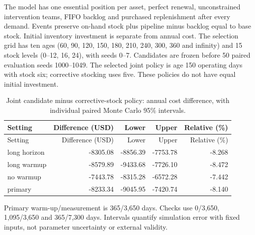 The model has one essential position per asset, perfect renewal, unconstrained intervention teams, FIFO backlog and purchased replenishment after every demand. Events preserve on-hand stock plus pipeline minus backlog equal to base stock. Initial inventory investment is separate from annual cost. The selection grid has ten ages (60, 90, 120, 150, 180, 210, 240, 300, 360 and infinity) and 15 stock levels (0--12, 16, 24), with seeds 0--7. Candidates are frozen before 50 paired evaluation seeds 1000--1049. The selected joint policy is age 150 operating days with stock six; corrective stocking uses five. These policies do not have equal initial investment.

\begin{small}

\setlength{\tabcolsep}{4pt}

\begin{longtable}{lrrrr}

\caption{Joint candidate minus corrective-stock policy: annual cost difference, with individual paired Monte Carlo 95\% intervals.}\label{tab:s-joint-evaluation}\\

\toprule

Setting & Difference (USD) & Lower & Upper & Relative (\%) \\

\midrule

\endfirsthead

\toprule

Setting & Difference (USD) & Lower & Upper & Relative (\%) \\

\midrule

\endhead

long horizon & -8305.08 & -8856.39 & -7753.78 & -8.268 \\

long warmup & -8579.89 & -9433.68 & -7726.10 & -8.472 \\

no warmup & -7443.78 & -8315.28 & -6572.28 & -7.442 \\

primary & -8233.34 & -9045.95 & -7420.74 & -8.140 \\

\bottomrule

\end{longtable}

\end{small}

Primary warm-up/measurement is 365/3,650 days. Checks use 0/3,650, 1,095/3,650 and 365/7,300 days. Intervals quantify simulation error with fixed inputs, not parameter uncertainty or external validity.

